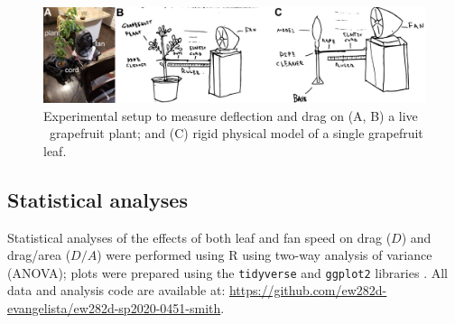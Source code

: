 \begin{figure}
\begin{center}
\includegraphics{figures/fig3.png}
\end{center}
\caption{Experimental setup to measure deflection and drag on (A, B) a live \Cxparadisi\ grapefruit plant; and (C) rigid physical model of a single grapefruit leaf.}
\label{fig:methods:drag}
\end{figure}













\subsection{Statistical analyses}
Statistical analyses of the effects of both leaf and fan speed on drag ($D$) and drag/area ($D/A$) were performed using R \citep{r2020} using two-way analysis of variance (ANOVA); plots were prepared using the \lstinline{tidyverse} and \lstinline{ggplot2} libraries \citep{wickham2019tidyverse}. All data and analysis code are available at: \url{https://github.com/ew282d-evangelista/ew282d-sp2020-0451-smith}.

















